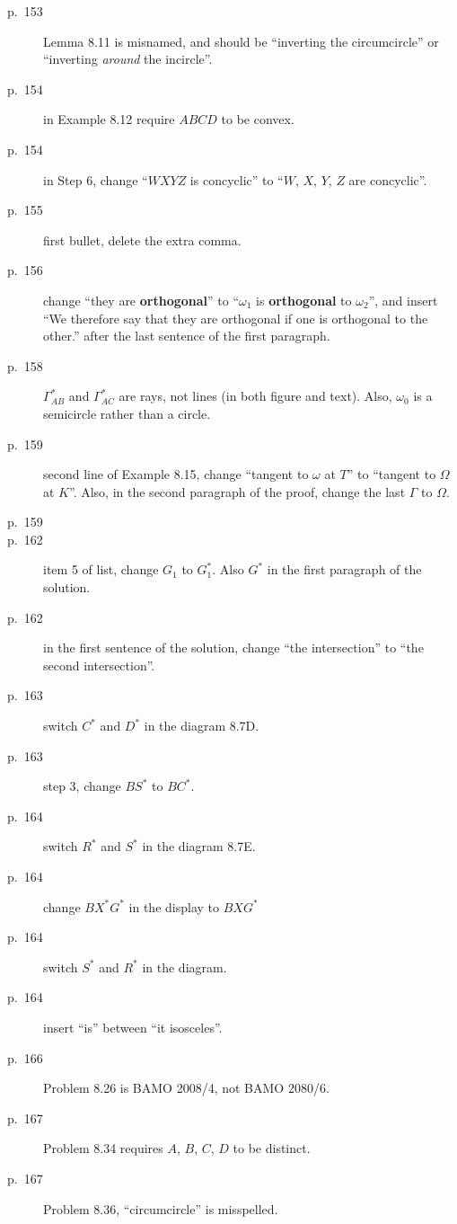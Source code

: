 \documentclass[11pt]{scrartcl}
\begin{document}
\begin{description}
\item[p.\  153] Lemma 8.11 is misnamed, and should be ``inverting the circumcircle''
  or ``inverting \emph{around} the incircle''.
\item[p.\  154] in Example 8.12 require $ABCD$ to be convex.
\item[p.\  154] in Step 6, change ``$WXYZ$ is concyclic'' to ``$W$, $X$, $Y$, $Z$ are concyclic''.
\item[p.\  155] first bullet, delete the extra comma.
\item[p.\  156] change ``they are \textbf{orthogonal}'' to ``$\omega_1$ is \textbf{orthogonal} to $\omega_2$'',
  and insert ``We therefore say that they are orthogonal if one is orthogonal to the other.'' after the last sentence of the first paragraph.
\item[p.\  158] $\Gamma_{AB}^\ast$ and $\Gamma_{AC}^\ast$ are rays, not lines (in both figure and text).
  Also, $\omega_0$ is a semicircle rather than a circle.
\item[p.\  159] second line of Example 8.15,
  change ``tangent to $\omega$ at $T$'' to ``tangent to $\Omega$ at $K$''.
  Also, in the second paragraph of the proof, change the last $\Gamma$ to $\Omega$.
\item[p.\  159] 
\item[p.\  162] item 5 of list, change $G_1$ to $G_1^\ast$.
  Also $G^\ast$ in the first paragraph of the solution.
\item[p.\  162] in the first sentence of the solution,
  change ``the intersection'' to ``the second intersection''.
\item[p.\  163] switch $C^\ast$ and $D^\ast$ in the diagram 8.7D.
\item[p.\  163] step 3, change $BS^\ast$ to $BC^\ast$.
\item[p.\  164] switch $R^\ast$ and $S^\ast$ in the diagram 8.7E.
\item[p.\  164] change $BX^\ast G^\ast$ in the display to $BXG^\ast$
\item[p.\  164] switch $S^\ast$ and $R^\ast$ in the diagram.
\item[p.\  164] insert ``is'' between ``it isosceles''.
\item[p.\  166] Problem 8.26 is BAMO 2008/4, not BAMO 2080/6.
\item[p.\  167] Problem 8.34 requires $A$, $B$, $C$, $D$ to be distinct.
\item[p.\  167] Problem 8.36, ``circumcircle'' is misspelled.

\end{description}
\end{document}

